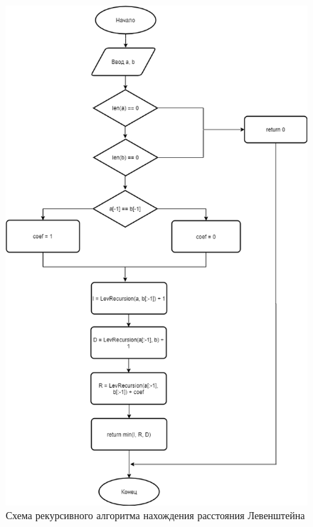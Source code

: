 \documentclass[a4paper, 12pt]{article}
\begin{document}
\begin{flushleft}
\begin{figure}[h]
		\centering \includegraphics[scale=0.6]{levrec}
		\centering \caption{Схема рекурсивного алгоритма нахождения расстояния Левенштейна}
	\end{figure}
    \clearpage
	\newpage
	\begin{figure}[h]

\end{figure}
\end{flushleft}
\end{document}

